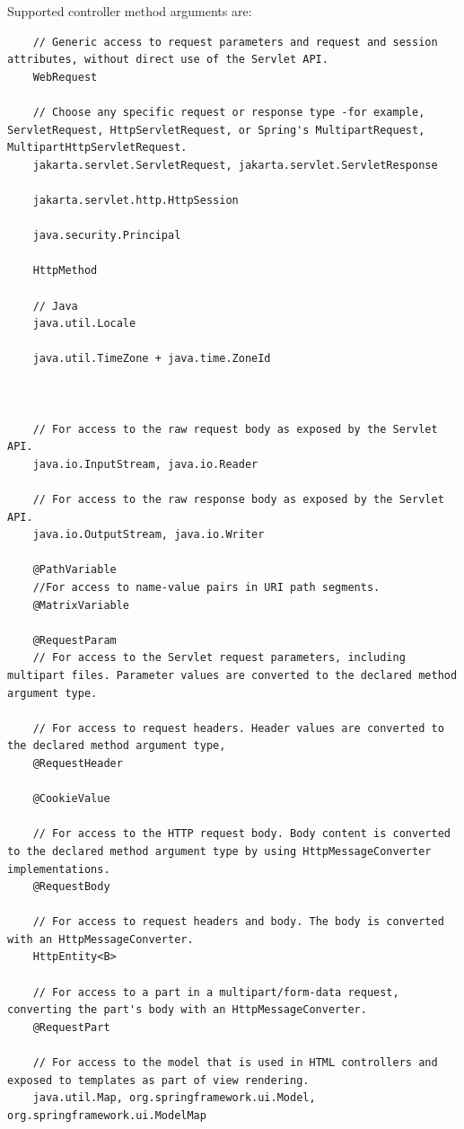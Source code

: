 \documentclass{scrartcl}
\begin{document}
    Supported controller method arguments are:

    \begin{lstlisting}
    // Generic access to request parameters and request and session attributes, without direct use of the Servlet API.
    WebRequest

    // Choose any specific request or response type -for example, ServletRequest, HttpServletRequest, or Spring's MultipartRequest, MultipartHttpServletRequest.
    jakarta.servlet.ServletRequest, jakarta.servlet.ServletResponse

    jakarta.servlet.http.HttpSession

    java.security.Principal

    HttpMethod

    // Java
    java.util.Locale

    java.util.TimeZone + java.time.ZoneId



    // For access to the raw request body as exposed by the Servlet API.
    java.io.InputStream, java.io.Reader

    // For access to the raw response body as exposed by the Servlet API.
    java.io.OutputStream, java.io.Writer

    @PathVariable
    //For access to name-value pairs in URI path segments.
    @MatrixVariable

    @RequestParam
    // For access to the Servlet request parameters, including multipart files. Parameter values are converted to the declared method argument type.

    // For access to request headers. Header values are converted to the declared method argument type,
    @RequestHeader

    @CookieValue

    // For access to the HTTP request body. Body content is converted to the declared method argument type by using HttpMessageConverter implementations.
    @RequestBody

    // For access to request headers and body. The body is converted with an HttpMessageConverter.
    HttpEntity<B>

    // For access to a part in a multipart/form-data request, converting the part's body with an HttpMessageConverter.
    @RequestPart

    // For access to the model that is used in HTML controllers and exposed to templates as part of view rendering.
    java.util.Map, org.springframework.ui.Model, org.springframework.ui.ModelMap


\end{lstlisting}
\end{document}
